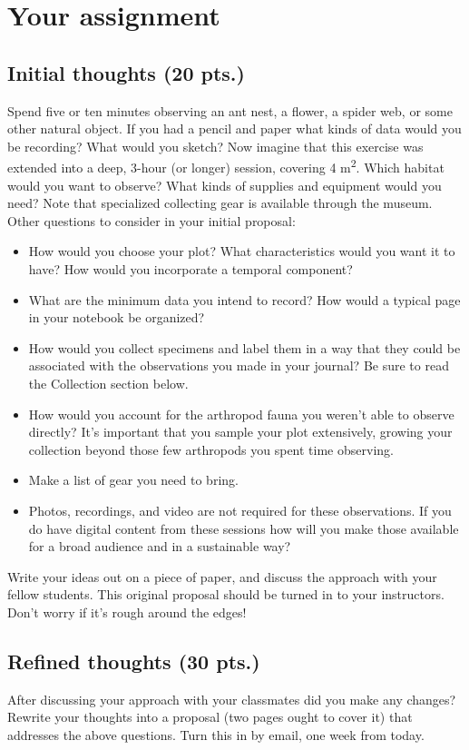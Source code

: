\documentclass[letterpaper, 11pt]{article}
\begin{document}
\section*{Your assignment}

\subsection*{Initial thoughts (20 pts.)}
Spend five or ten minutes observing an ant nest, a flower, a spider web, or some other natural object. If you had a pencil and paper what kinds of data would you be recording? What would you sketch? Now imagine that this exercise was extended into a deep, 3-hour (or longer) session, covering 4 m\textsuperscript{2}. Which habitat would you want to observe? What kinds of supplies and equipment would you need? Note that specialized collecting gear is available through the museum. Other questions to consider in your initial proposal:
\begin{itemize}
\item How would you choose your plot? What characteristics would you want it to have? How would you incorporate a temporal component? 
\item What are the minimum data you intend to record? How would a typical page in your notebook be organized?
\item How would you collect specimens and label them in a way that they could be associated with the observations you made in your journal? Be sure to read the Collection section below.
\item How would you account for the arthropod fauna you weren't able to observe directly? It's important that you sample your plot extensively, growing your collection beyond those few arthropods you spent time observing. 
\item Make a list of gear you need to bring.
\item Photos, recordings, and video are not required for these observations. If you do have digital content from these sessions how will you make those available for a broad audience and in a sustainable way?
\end{itemize}

\noindent{}Write your ideas out on a piece of paper, and discuss the approach with your fellow students. This original proposal should be turned in to your instructors. Don't worry if it's rough around the edges!

\subsection*{Refined thoughts (30 pts.)}
After discussing your approach with your classmates did you make any changes? Rewrite your thoughts into a proposal (two pages ought to cover it) that addresses the above questions. Turn this in by email, one week from today.
\end{document}

